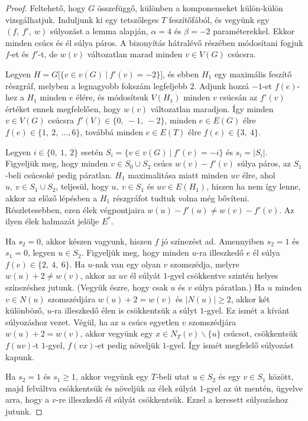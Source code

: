 \documentclass[12pt, a4paper]{report}
\theoremstyle{remark}
\theoremstyle{definition}
\begin{document}
\begin{proof}
Feltehető, hogy $G$ összefüggő, különben a komponenseket külön-külön vizsgálhatjuk. Induljunk ki egy tetszőleges $T$ feszítőfából, és vegyünk egy $(f,\ f',\ w)$ súlyozást a lemma alapján, $\alpha = 4$ és $\beta = -2$ paraméterekkel. Ekkor minden csúcs és él súlya páros. A bizonyítás hátralévő részében módosítani fogjuk $f$-et és $f'$-t, de $w(v)$ változatlan marad minden $v \in V(G)$ csúcsra.

Legyen $H = G\lbrack \lbrace v \in v(G)\ |\ f'(v) = -2 \rbrace \rbrack$, és ebben $H_1$ egy maximális feszítő részgráf, melyben a legnagyobb fokszám legfeljebb $2$. Adjunk hozzá $-1$-et $f(e)$-hez a $H_1$ minden $e$ élére, és módosítsuk $V(H_1)$ minden $v$ csúcsán az $f'(v)$ értéket ennek megfelelően, hogy $w(v)$ változatlan maradjon. Így minden $v \in V(G)$ csúcsra $f'(V) \in \lbrace 0,\ -1,\ -2 \rbrace$, minden $e \in E(G)$ élre $f(e) \in \lbrace 1,\ 2,\ \ldots, 6 \rbrace$, továbbá minden $e \in E(T)$ élre $f(e) \in \lbrace 3,\ 4 \rbrace$.

Legyen $i \in \lbrace 0,\ 1,\ 2 \rbrace$ esetén $S_i = \lbrace v \in v(G)\ |\ f'(v) = -i \rbrace$ és $s_i = |S_i|$. Figyeljük meg, hogy minden $v \in S_0 \cup S_2$ csúcs $w(v) - f'(v)$ súlya páros, az $S_1$-beli csúcsoké pedig páratlan. $H_1$ maximalitása miatt minden $uv$ élre, ahol $u,\ v \in S_1 \cup S_2$, teljesül, hogy $u,\ v \in S_1$ és $uv \in E(H_1)$, hiszen ha nem így lenne, akkor az előző lépésben a $H_1$ részgráfot tudtuk volna még bővíteni. Részletesebben, ezen élek végpontjaira $w(u) - f'(u) \neq w(v) - f'(v)$. Az ilyen élek halmazát jelölje $E^*$.

Ha $s_2 = 0$, akkor készen vagyunk, hiszen $f$ jó színezést ad. Amennyiben $s_2 = 1$ és $s_1 = 0$, legyen $u \in S_2$. Figyeljük meg, hogy minden $u$-ra illeszkedő $e$ él súlya $f(e) \in \lbrace 2,\ 4,\ 6 \rbrace$. Ha $u$-nak van egy olyan $v$ szomszédja, melyre $w(u) + 2 \neq w(v)$, akkor az $uv$ él súlyát $1$-gyel csökkentve szintén helyes színezéshez jutunk. (Vegyük észre, hogy csak $u$ és $v$ súlya páratlan.) Ha $u$ minden $v \in N(u)$ szomszédjára $w(u) + 2 = w(v)$ és $|N(u)| \geq 2$, akkor két különböző, $u$-ra illeszkedő élen is csökkentsük a súlyt $1$-gyel. Ez ismét a kívánt súlyozáshoz vezet. Végül, ha az $u$ csúcs egyetlen $v$ szomszédjára $w(u) + 2 = w(v)$, akkor vegyünk egy $x \in N_T(v) \smallsetminus \lbrace u \rbrace$ csúcsot, csökkentsük $f(uv)$-t $1$-gyel, $f(vx)$-et pedig növeljük $1$-gyel. Így ismét megfelelő súlyozást kapunk.

Ha $s_2 = 1$ és $s_1 \geq 1$, akkor vegyünk egy $T$-beli utat $u \in S_2$ és egy $v \in S_1$ között, majd felváltva csökkentsük és növeljük az élek súlyát $1$-gyel az út mentén, ügyelve arra, hogy a $v$-re illeszkedő él súlyát csökkentsük. Ezzel a keresett súlyozáshoz jutunk.


\end{proof}
\end{document}
